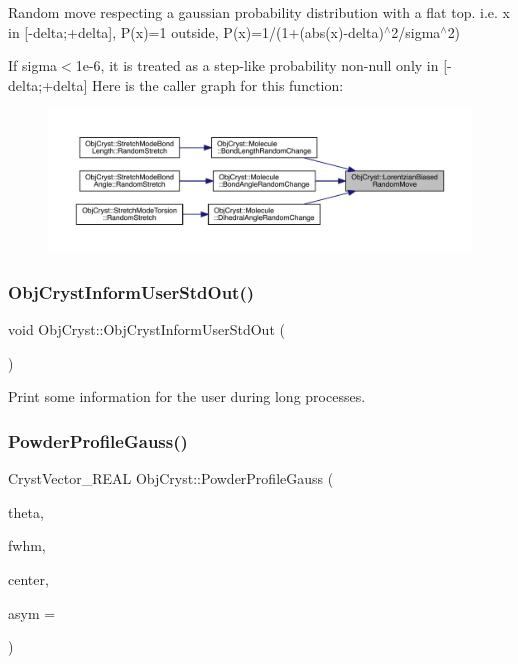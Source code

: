 Random move respecting a gaussian probability distribution with a flat top. i.\+e. x in \mbox{[}-\/delta;+delta\mbox{]}, P(x)=1 outside, P(x)=1/(1+(abs(x)-\/delta)$^\wedge$2/sigma$^\wedge$2)

If sigma$<$1e-\/6, it is treated as a step-\/like probability non-\/null only in \mbox{[}-\/delta;+delta\mbox{]} Here is the caller graph for this function\+:
\nopagebreak
\begin{figure}[H]
\begin{center}
\leavevmode
\includegraphics[width=350pt]{namespace_obj_cryst_a8b6775b47b6ebf273d5737006ffd3209_icgraph}
\end{center}
\end{figure}
\mbox{\label{namespace_obj_cryst_a9aa5136f02bf658a273ece563304fc03}} 
\subsubsection{\texorpdfstring{ObjCrystInformUserStdOut()}{ObjCrystInformUserStdOut()}}
{\footnotesize\ttfamily void Obj\+Cryst\+::\+Obj\+Cryst\+Inform\+User\+Std\+Out (\begin{DoxyParamCaption}\item[{const string \&}]{ }\end{DoxyParamCaption})}

Print some information for the user during long processes. \mbox{\label{namespace_obj_cryst_a0e958fc90a47363fe0293f25b500c3ab}} 
\subsubsection{\texorpdfstring{PowderProfileGauss()}{PowderProfileGauss()}}
{\footnotesize\ttfamily Cryst\+Vector\+\_\+\+R\+E\+AL Obj\+Cryst\+::\+Powder\+Profile\+Gauss (\begin{DoxyParamCaption}\item[{const Cryst\+Vector\+\_\+\+R\+E\+AL}]{theta,  }\item[{const R\+E\+AL}]{fwhm,  }\item[{const R\+E\+AL}]{center,  }\item[{const R\+E\+AL}]{asym = {} }\end{DoxyParamCaption})}

